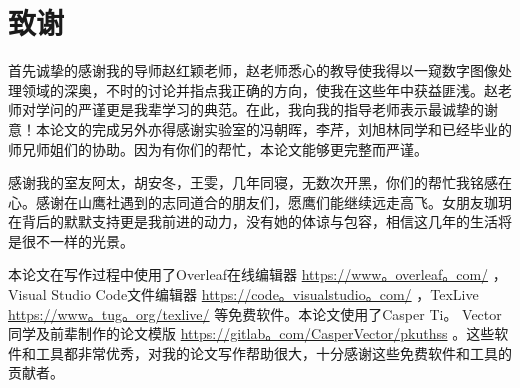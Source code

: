 
\chapter{致谢}
首先诚挚的感谢我的导师赵红颖老师，赵老师悉心的教导使我得以一窥数字图像处理领域的深奥，不时的讨论并指点我正确的方向，使我在这些年中获益匪浅。赵老师对学问的严谨更是我辈学习的典范。在此，我向我的指导老师表示最诚挚的谢意！本论文的完成另外亦得感谢实验室的冯朝晖，李芹，刘旭林同学和已经毕业的师兄师姐们的协助。因为有你们的帮忙，本论文能够更完整而严谨。
\par
感谢我的室友阿太，胡安冬，王雯，几年同寝，无数次开黑，你们的帮忙我铭感在心。感谢在山鹰社遇到的志同道合的朋友们，愿鹰们能继续远走高飞。女朋友珈玥在背后的默默支持更是我前进的动力，没有她的体谅与包容，相信这几年的生活将是很不一样的光景。
\par
本论文在写作过程中使用了Overleaf在线编辑器 \url{https://www。overleaf。com/} ，Visual Studio Code文件编辑器 \url{https://code。visualstudio。com/} ，TexLive \url{https://www。tug。org/texlive/} 等免费软件。本论文使用了Casper Ti。 Vector同学及前辈制作的论文模版 \url{https://gitlab。com/CasperVector/pkuthss} 。这些软件和工具都非常优秀，对我的论文写作帮助很大，十分感谢这些免费软件和工具的贡献者。

